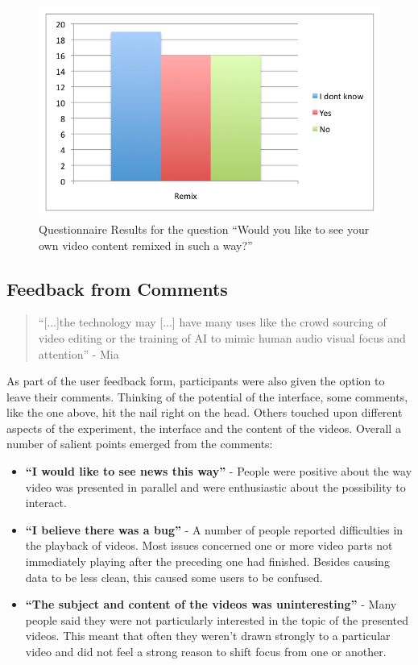 \begin{figure}[htbp]
  \centering
    \includegraphics[width=.6\textwidth]{img/evaluation/quest_remix}
  \caption{Questionnaire Results for the question ``Would you like to see your own video content remixed in such a way?''}
  \label{fig:quest_remix}
\end{figure}


\subsection{Feedback from Comments} %
\label{sub:feedback_from_comments}

\begin{quote}
  ``[...]the technology may [...] have many uses like the crowd sourcing of video editing or the training of AI to mimic human audio visual focus and attention'' - Mia
\end{quote}

As part of the user feedback form, participants were also given the option to leave their comments. Thinking of the potential of the interface, some comments, like the one above, hit the nail right on the head. Others touched upon different aspects of the experiment, the interface and the content of the videos. Overall a number of salient points emerged from the comments:

\begin{itemize}
  \item \textbf{``I would like to see news this way''} - People were positive about the way video was presented in parallel and were enthusiastic about the possibility to interact.
  \item \textbf{``I believe there was a bug''} - A number of people reported difficulties in the playback of videos. Most issues concerned one or more video parts not immediately playing after the preceding one had finished. Besides causing data to be less clean, this caused some users to be confused.
  \item \textbf{``The subject and content of the videos was uninteresting''} - Many people said they were not particularly interested in the topic of the presented videos. This meant that often they weren't drawn strongly to a particular video and did not feel a strong reason to shift focus from one or another.
\end{itemize}

